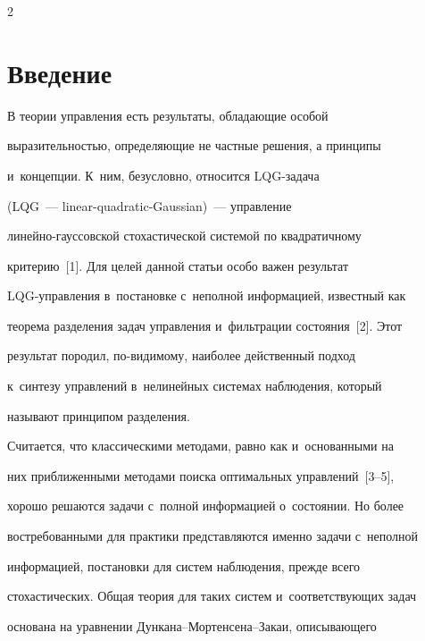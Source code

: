 \begin{multicols}{2}





\label{st\stat}








\section{Введение}





     В теории управления есть результаты, обладающие особой 


выразительностью, определяющие не частные решения, а принципы 


и~концепции. К~ним, безусловно, относится LQG-за\-да\-ча


(LQG~--- linear-quadratic-Gaussian)~--- управление  


ли\-ней\-но-гаус\-сов\-ской стохастической сис\-те\-мой по квадратичному 


критерию~[1]. Для целей данной статьи особо важен результат  


LQG-управ\-ле\-ния в~постановке с~неполной информацией, известный как 


теорема разделения задач управления и~фильт\-ра\-ции со\-сто\-яния~[2]. Этот 


результат породил, по-ви\-ди\-мо\-му, наиболее действенный подход 


к~синтезу управлений в~нелинейных системах наблюдения, который 


называют принципом разделения.


     


     Считается, что классическими методами, равно как и~основанными на 


них приближенными методами поиска оптимальных управлений~[3--5], 


хорошо решаются задачи с~полной информацией о~со\-сто\-янии. Но более 


востребованными для практики представляются именно задачи с~неполной 


информацией, постановки для систем наблюдения, прежде всего 


стохастических. Общая теория для таких систем и~соответствующих задач 


основана на уравнении Дун\-ка\-на--Мор\-тен\-се\-на--За\-каи, описывающего 



\end{multicols}
